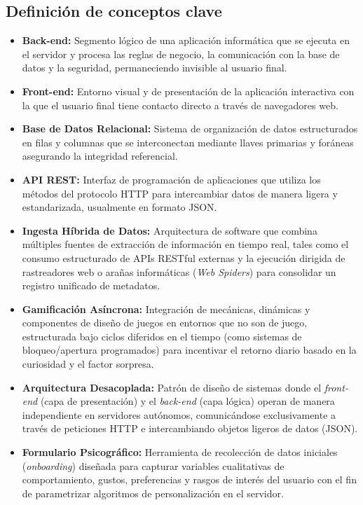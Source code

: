 \documentclass[12pt, atypical, journal]{article}
\begin{document}
\subsection{Definición de conceptos clave}
\begin{itemize}
   \item \textbf{Back-end:} Segmento lógico de una aplicación informática que se ejecuta en el servidor y procesa las reglas de negocio, la comunicación con la base de datos y la seguridad, permaneciendo invisible al usuario final.
   \item \textbf{Front-end:} Entorno visual y de presentación de la aplicación interactiva con la que el usuario final tiene contacto directo a través de navegadores web.
   \item \textbf{Base de Datos Relacional:} Sistema de organización de datos estructurados en filas y columnas que se interconectan mediante llaves primarias y foráneas asegurando la integridad referencial.
   \item \textbf{API REST:} Interfaz de programación de aplicaciones que utiliza los métodos del protocolo HTTP para intercambiar datos de manera ligera y estandarizada, usualmente en formato JSON.
   \item \textbf{Ingesta Híbrida de Datos:} Arquitectura de software que combina múltiples fuentes de extracción de información en tiempo real, tales como el consumo estructurado de APIs RESTful externas y la ejecución dirigida de rastreadores web o arañas informáticas (\textit{Web Spiders}) para consolidar un registro unificado de metadatos.
   \item \textbf{Gamificación Asíncrona:} Integración de mecánicas, dinámicas y componentes de diseño de juegos en entornos que no son de juego, estructurada bajo ciclos diferidos en el tiempo (como sistemas de bloqueo/apertura programados) para incentivar el retorno diario basado en la curiosidad y el factor sorpresa.
   \item \textbf{Arquitectura Desacoplada:} Patrón de diseño de sistemas donde el \textit{front-end} (capa de presentación) y el \textit{back-end} (capa lógica) operan de manera independiente en servidores autónomos, comunicándose exclusivamente a través de peticiones HTTP e intercambiando objetos ligeros de datos (JSON).
   \item \textbf{Formulario Psicográfico:} Herramienta de recolección de datos iniciales (\textit{onboarding}) diseñada para capturar variables cualitativas de comportamiento, gustos, preferencias y rasgos de interés del usuario con el fin de parametrizar algoritmos de personalización en el servidor.
\end{itemize}
\end{document}
